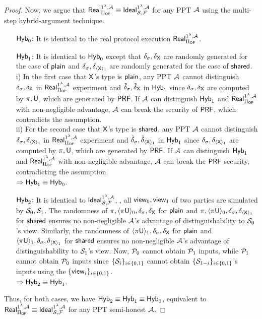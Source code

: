 \begin{proof}
	Now, we argue that $\mathsf{Real}^{1^\lambda,\mathcal{A}}_{\Pi_{\mathsf{OP}}}\equiv\mathsf{Ideal}^{1^\lambda, \mathcal{A}}_{\mathcal{S}, \mathcal{F}}$ for any PPT $\mathcal{A}$ using the multi-step hybrid-argument technique.
	 \begin{itemize}
		 \item[$\mathsf{Hyb}_0$:] It is identical to the real protocol execution $\mathsf{Real}^{1^\lambda,\mathcal{A}}_{\Pi_{\mathsf{OP}}}$.
		 \item[$\mathsf{Hyb}_{1}$:] It is identical to $\mathsf{Hyb}_0$ except that $\delta_\sigma,\delta_{\mathsf{X}}$ are randomly generated for the case of $\mathsf{plain}$ and $\delta_\sigma,\delta_{\langle\mathsf{X}\rangle_1}$ are randomly generated for the case of $\mathsf{shared}$.
		 \\
		 i) In the first case that $\mathsf{X}$'s type is $\mathsf{plain}$, any PPT $\mathcal{A}$ cannot distinguish $\delta_\sigma,\delta_{\mathsf{X}}$ in $\mathsf{Real}^{1^\lambda,\mathcal{A}}_{\Pi_{\mathsf{OP}}}$ experiment and $\Tilde{\delta}_\sigma,\Tilde{\delta}_{\mathsf{X}}$ in $\mathsf{Hyb}_1$ since $\delta_\sigma,\delta_{\mathsf{X}}$ are computed by $\pi,\mathsf{U}$, which are generated by $\mathsf{PRF}$.
		 If $\mathcal{A}$ can distinguish $\mathsf{Hyb}_{1}$ and $\mathsf{Real}^{1^\lambda,\mathcal{A}}_{\Pi_{\mathsf{OP}}}$ with non-negligible advantage, $\mathcal{A}$ can break the security of $\mathsf{PRF}$, which contradicts the assumption.
		 \\
		 ii) For the second case that $\mathsf{X}$'s type is $\mathsf{shared}$, any PPT $\mathcal{A}$ cannot distinguish $\delta_\sigma,\delta_{\langle\mathsf{X}\rangle_1}$ in $\mathsf{Real}^{1^\lambda,\mathcal{A}}_{\Pi_{\mathsf{OP}}}$ experiment and $\Tilde{\delta}_\sigma,\Tilde{\delta}_{\langle\mathsf{X}\rangle_1}$ in $\mathsf{Hyb}_1$ since $\delta_\sigma,\delta_{\langle\mathsf{X}\rangle_1}$ are computed by $\pi,\mathsf{U}$, which are generated by $\mathsf{PRF}$.
		 If $\mathcal{A}$ can distinguish $\mathsf{Hyb}_{1}$ and $\mathsf{Real}^{1^\lambda,\mathcal{A}}_{\Pi_{\mathsf{OP}}}$ with non-negligible advantage, $\mathcal{A}$ can break the $\mathsf{PRF}$ security, contradicting the assumption.
		 \\
		 $\Rightarrow \mathsf{Hyb}_1\equiv\mathsf{Hyb}_0$.
		 \item[$\mathsf{Hyb}_{2}$:] It is identical to $\mathsf{Ideal}^{1^\lambda, \mathcal{A}}_{\mathcal{S}, \mathcal{F}}$, \ie, all $\mathsf{view}_0,\mathsf{view}_1$ of two parties are simulated by $\mathcal{S}_0,\mathcal{S}_1$.
		 The randomness of $\pi,\langle \pi\mathsf{U} \rangle_0, \delta_{\sigma}, \delta_{\mathsf{X}}$ for $\mathsf{plain}$ and $\pi,\langle \pi\mathsf{U} \rangle_0, \delta_{\sigma}, \delta_{\langle\mathsf{X}\rangle_1}$ for $\mathsf{shared}$ ensures no non-negligible $\mathcal{A}$'s advantage of distinguishability to $\mathcal{S}_0$'s view.
		 Similarly, the randomness of $\langle \pi\mathsf{U} \rangle_1, \delta_{\sigma}, \delta_{\mathsf{X}}$ for $\mathsf{plain}$ and $\langle \pi\mathsf{U} \rangle_1, \allowbreak\delta_{\sigma}, \delta_{\langle\mathsf{X}\rangle_1}$ for $\mathsf{shared}$ ensures no non-negligible $\mathcal{A}$'s advantage of distinguishability to $\mathcal{S}_1$'s view.
		 Now, $\mathcal{P}_0$ cannot obtain $\mathcal{P}_1$ inputs, while $\mathcal{P}_1$ cannot obtain $\mathcal{P}_0$ inputs since $\{\mathcal{S}_i\}_{i\in\{0,1\}}$ cannot obtain $\{\mathcal{S}_{1-i}\}_{i\in\{0,1\}}$'s inputs using the $\{\mathsf{view}_i\}_{i\in\{0,1\}}$.\\
		 $\Rightarrow \mathsf{Hyb}_2\equiv\mathsf{Hyb}_1$.
	 \end{itemize}
Thus, for both cases, %
we have $\mathsf{Hyb}_2\equiv\mathsf{Hyb}_1\equiv\mathsf{Hyb}_0$, equivalent to $\mathsf{Real}^{1^\lambda,\mathcal{A}}_{\Pi_{\mathsf{OP}}}\equiv\mathsf{Ideal}^{1^\lambda, \mathcal{A}}_{\mathcal{S}, \mathcal{F}}$ for any PPT semi-honest $\mathcal{A}$.
\end{proof}


